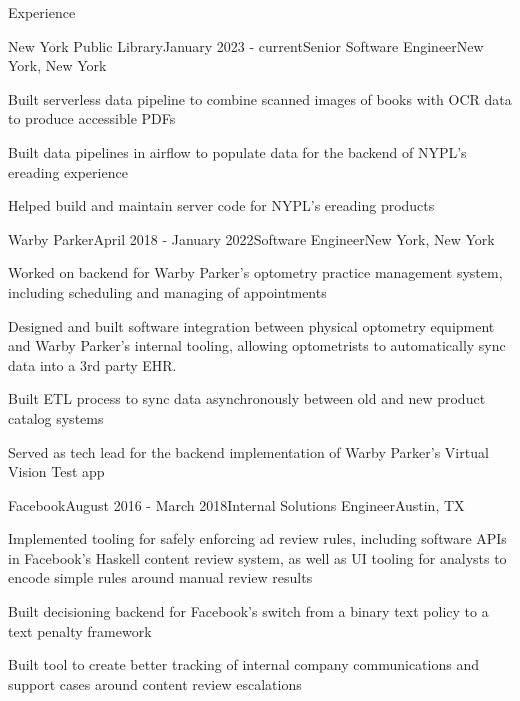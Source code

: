 \documentclass{resume} %
\begin{document}

\begin{rSection}{Experience}

\begin{rSubsection}{New York Public Library}{January 2023 - current}{Senior Software Engineer}{New York, New York}
\item Built serverless data pipeline to combine scanned images of books with OCR data to produce accessible PDFs
\item Built data pipelines in airflow to populate data for the backend of NYPL's ereading experience
\item Helped build and maintain server code for NYPL's ereading products
\end{rSubsection}

\begin{rSubsection}{Warby Parker}{April 2018 - January 2022}{Software Engineer}{New York, New York}
\item Worked on backend for Warby Parker's optometry practice management system, including scheduling and managing of appointments
\item Designed and built software integration between physical optometry equipment and Warby Parker's internal tooling, allowing optometrists to automatically sync data into a 3rd party EHR.
\item Built ETL process to sync data asynchronously between old and new product catalog systems
\item Served as tech lead for the backend implementation of Warby Parker's Virtual Vision Test app
\end{rSubsection}


\begin{rSubsection}{Facebook}{August 2016 - March 2018}{Internal Solutions Engineer}{Austin, TX}
\item Implemented tooling for safely enforcing ad review rules, including software APIs in Facebook's Haskell content review system, as well as UI tooling for analysts to encode simple rules around manual review results
\item Built decisioning backend for Facebook's switch from a binary text policy to a text penalty framework
\item Built tool to create better tracking of internal company communications and support cases around content review escalations
\end{rSubsection}


\end{rSection}
\end{document}
